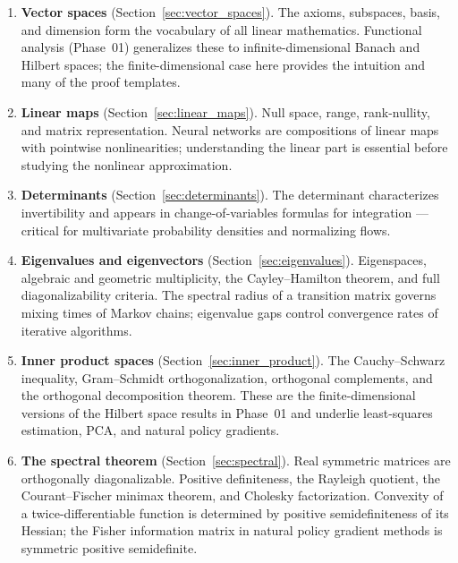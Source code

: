 \documentclass[11pt,a4paper]{article}
\theoremstyle{definition}
\theoremstyle{plain}
\theoremstyle{remark}
\begin{document}
\begin{enumerate}[nosep]
    \item \textbf{Vector spaces} (Section~\ref{sec:vector_spaces}). The axioms,
    subspaces, basis, and dimension form the vocabulary of all linear mathematics.
    Functional analysis (Phase~01) generalizes these to infinite-dimensional
    Banach and Hilbert spaces; the finite-dimensional case here provides the
    intuition and many of the proof templates.

    \item \textbf{Linear maps} (Section~\ref{sec:linear_maps}). Null space, range,
    rank-nullity, and matrix representation. Neural networks are compositions of
    linear maps with pointwise nonlinearities; understanding the linear part is
    essential before studying the nonlinear approximation.

    \item \textbf{Determinants} (Section~\ref{sec:determinants}). The determinant
    characterizes invertibility and appears in change-of-variables formulas for
    integration --- critical for multivariate probability densities and normalizing
    flows.

    \item \textbf{Eigenvalues and eigenvectors} (Section~\ref{sec:eigenvalues}).
    Eigenspaces, algebraic and geometric multiplicity, the Cayley--Hamilton theorem,
    and full diagonalizability criteria. The spectral radius of a transition matrix
    governs mixing times of Markov chains; eigenvalue gaps control convergence rates
    of iterative algorithms.

    \item \textbf{Inner product spaces} (Section~\ref{sec:inner_product}). The
    Cauchy--Schwarz inequality, Gram--Schmidt orthogonalization, orthogonal
    complements, and the orthogonal decomposition theorem. These are the
    finite-dimensional versions of the Hilbert space results in Phase~01 and
    underlie least-squares estimation, PCA, and natural policy gradients.

    \item \textbf{The spectral theorem} (Section~\ref{sec:spectral}). Real symmetric
    matrices are orthogonally diagonalizable. Positive definiteness, the Rayleigh
    quotient, the Courant--Fischer minimax theorem, and Cholesky factorization.
    Convexity of a twice-differentiable function is determined by positive
    semidefiniteness of its Hessian; the Fisher information matrix in natural
    policy gradient methods is symmetric positive semidefinite.


\end{enumerate}
\end{document}
